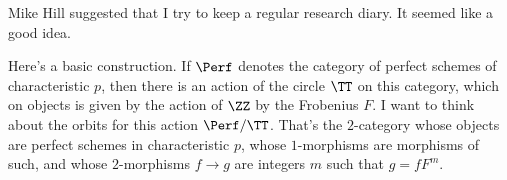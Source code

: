 
Mike Hill suggested that I try to keep a regular research diary.
It seemed like a good idea.

Here's a basic construction.
If $\Perf$ denotes the category of perfect schemes of characteristic $p$,
then there is an action of the circle $\TT$ on this category,
which on objects is given by the action of $\ZZ$ by the Frobenius $F$.
I want to think about the orbits for this action $\Perf/\TT$.
That's the $2$-category whose objects are perfect schemes in characteristic $p$,
whose $1$-morphisms are morphisms of such,
and whose $2$-morphisms $f \to g$ are integers $m$ such that $g = f F^m$.


